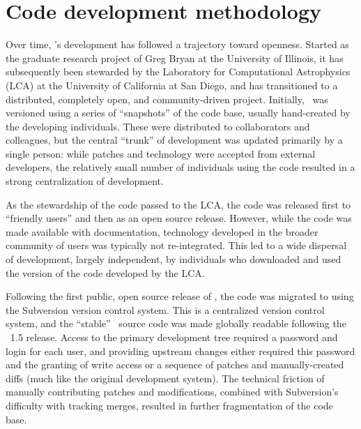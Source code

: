 
\section{Code development methodology}
\label{sec.development}

Over time, \enzo's development has followed a trajectory toward
openness.  Started as the graduate research project of Greg Bryan at
the University of Illinois, it has subsequently been stewarded by
the Laboratory for Computational Astrophysics (LCA) at the University
of California at San Diego, and has transitioned to a distributed,
completely open, and community-driven project.  Initially, \enzo\ was
versioned using a series of ``snapshots'' of the code base, usually
hand-created by the developing individuals.  These were distributed to
collaborators and colleagues, but the central ``trunk'' of development
was updated primarily by a single person: while patches and technology
were accepted from external developers, the relatively small number of
individuals using the code resulted in a strong centralization of
development.

As the stewardship of the code passed to the LCA, the code was
released first to ``friendly users'' and then as an open source
release.  However, while the code was made available with
documentation, technology developed in the broader community of users
was typically not re-integrated.  This led to a wide dispersal of
development, largely independent, by individuals who downloaded and
used the version of the code developed by the LCA.


Following the first public, open source release of \enzo, the code was
migrated to using the Subversion version control system.  This is a
centralized version control system, and the ``stable'' \enzo\ source
code was made globally readable following the \enzo\ 1.5 release.
Access to the primary development tree required a password and login
for each user, and providing upstream changes either required this
password and the granting of write access or a sequence of patches and
manually-created diffs (much like the original development system).
The technical friction of manually contributing patches and
modifications, combined with Subversion's difficulty with tracking
merges, resulted in further fragmentation of the code base.

